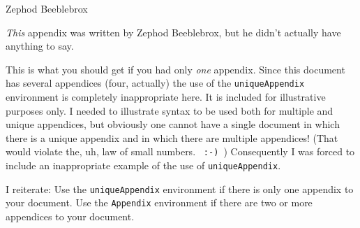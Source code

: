 \documentclass[
doublespace,
  times]{anzsauth}
\begin{document}
\begin{Appendix}
\label{app:zephod}
\begin{center}
Zephod Beeblebrox
\end{center}


\emph{This} appendix was written by Zephod Beeblebrox, but he didn't
actually have anything to say. \lipsum[3]

\end{Appendix}

\begin{uniqueAppendix}

This is what you should get if you had only \emph{one} appendix.
Since this document has several appendices (four, actually) the
use of the \texttt{uniqueAppendix} environment is completely
inappropriate here.  It is included for illustrative purposes
only.  I needed to illustrate syntax to be used both for multiple
and unique appendices, but obviously one cannot have a single
document in which there is a unique appendix and in which there are
multiple appendices!  (That would violate the, uh, law of small
numbers. \verb! :-) !)  Consequently I was forced to include an
inappropriate example of the use of \texttt{uniqueAppendix}.

I reiterate:  Use the \texttt{uniqueAppendix} environment if there is
only one appendix to your document.  Use the \texttt{Appendix}
environment if there are two or more appendices to your document.
\end{uniqueAppendix}


  
\end{document}
